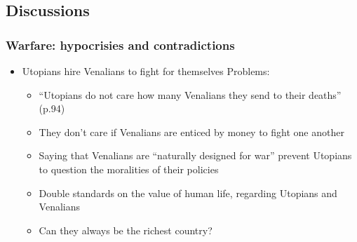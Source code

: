 \documentclass[11pt]{article}
\begin{document}
\subsection{Discussions}
\label{sec:orgef34807}
\subsubsection{Warfare: hypocrisies and contradictions}
\label{sec:org25023fa}
\begin{itemize}
\item Utopians hire Venalians to fight for themselves
Problems:
\begin{itemize}
\item ``Utopians do not care how many Venalians they send to their deaths'' (p.94)
\item They don't care if Venalians are enticed by money to fight one another
\item Saying that Venalians are ``naturally designed for war'' prevent Utopians to
question the moralities of their policies
\item Double standards on the value of human life, regarding Utopians and Venalians
\item Can they always be the richest country?
\end{itemize}
\end{itemize}
\end{document}
